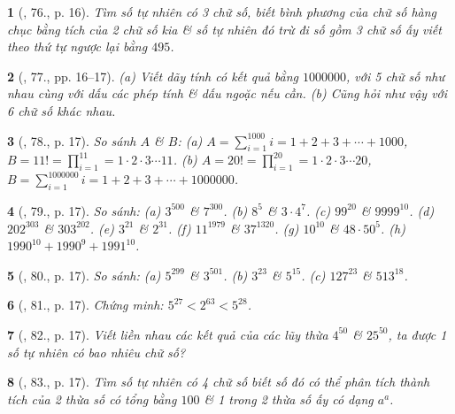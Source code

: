 \documentclass{article}
\newtheorem{baitoan}{}
\begin{document}
\begin{baitoan}[\cite{Binh_Toan_6_tap_1}, 76., p. 16]
	Tìm số tự nhiên có 3 chữ số, biết bình phương của chữ số hàng chục bằng tích của 2 chữ số kia \& số tự nhiên đó trừ đi số gồm 3 chữ số ấy viết theo thứ tự ngược lại bằng $495$.
\end{baitoan}

\begin{baitoan}[\cite{Binh_Toan_6_tap_1}, 77., pp. 16--17]
	(a) Viết dãy tính có kết quả bằng $1000000$, với 5 chữ số như nhau cùng với dấu các phép tính \& dấu ngoặc nếu cần. (b) Cũng hỏi như vậy với 6 chữ số khác nhau.
\end{baitoan}

\begin{baitoan}[\cite{Binh_Toan_6_tap_1}, 78., p. 17]
	So sánh $A$ \& $B$: (a) $A = \sum_{i=1}^{1000} i = 1 + 2 + 3 + \cdots + 1000$, $B = 11! = \prod_{i=1}^{11} = 1\cdot2\cdot3\cdots11$. (b) $A = 20! = \prod_{i=1}^{20} = 1\cdot2\cdot3\cdots20$, $B = \sum_{i=1}^{1000000} i = 1 + 2 + 3 + \cdots + 1000000$.
\end{baitoan}

\begin{baitoan}[\cite{Binh_Toan_6_tap_1}, 79., p. 17]
	So sánh: (a) $3^{500}$ \& $7^{300}$. (b) $8^5$ \& $3\cdot4^7$. (c) $99^{20}$ \& $9999^{10}$. (d) $202^{303}$ \& $303^{202}$. (e) $3^{21}$ \& $2^{31}$. (f) $11^{1979}$ \& $37^{1320}$. (g) $10^10$ \& $48\cdot50^5$. (h) $1990^{10} + 1990^9 + 1991^{10}$.
\end{baitoan}

\begin{baitoan}[\cite{Binh_Toan_6_tap_1}, 80., p. 17]
	So sánh: (a) $5^{299}$ \& $3^{501}$. (b) $3^{23}$ \& $5^{15}$. (c) $127^{23}$ \& $513^{18}$.
\end{baitoan}

\begin{baitoan}[\cite{Binh_Toan_6_tap_1}, 81., p. 17]
	 Chứng minh: $5^{27} < 2^{63} < 5^{28}$.
\end{baitoan}

\begin{baitoan}[\cite{Binh_Toan_6_tap_1}, 82., p. 17]
	Viết liền nhau các kết quả của các lũy thừa $4^{50}$ \& $25^{50}$, ta được 1 số tự nhiên có bao nhiêu chữ số?
\end{baitoan}

\begin{baitoan}[\cite{Binh_Toan_6_tap_1}, 83., p. 17]
	Tìm số tự nhiên có 4 chữ số biết số đó có thể phân tích thành tích của 2 thừa số có tổng bằng $100$ \& 1 trong 2 thừa số ấy có dạng $a^a$.
\end{baitoan}
\end{document}
